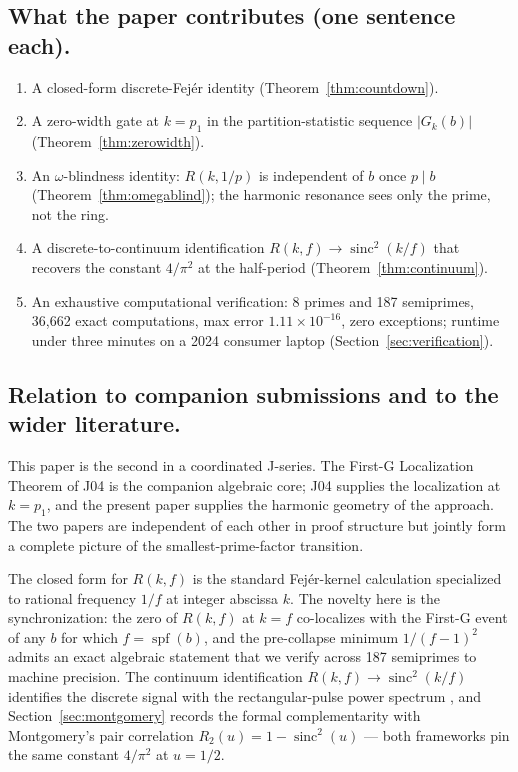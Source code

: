 \documentclass[11pt,reqno]{amsart}
\theoremstyle{plain}
\theoremstyle{definition}
\theoremstyle{remark}
\DeclareMathOperator{\spf}{spf}
\DeclareMathOperator{\sinc}{sinc}
\begin{document}
\subsection*{What the paper contributes (one sentence each).}
\begin{enumerate}[label={\upshape(\arabic*)}]
\item A closed-form discrete-Fej\'er identity (Theorem~\ref{thm:countdown}).
\item A zero-width gate at $k = p_1$ in the partition-statistic
      sequence $|G_k(b)|$ (Theorem~\ref{thm:zerowidth}).
\item An $\omega$-blindness identity: $R(k, 1/p)$ is independent of
      $b$ once $p \mid b$ (Theorem~\ref{thm:omegablind}); the
      harmonic resonance sees only the prime, not the ring.
\item A discrete-to-continuum identification $R(k, f) \to \sinc^2(k/f)$
      that recovers the constant $4/\pi^2$ at the half-period
      (Theorem~\ref{thm:continuum}).
\item An exhaustive computational verification: 8 primes and 187
      semiprimes, 36{,}662 exact computations, max error
      $1.11 \times 10^{-16}$, zero exceptions; runtime under three
      minutes on a 2024 consumer laptop (Section~\ref{sec:verification}).
\end{enumerate}

\subsection*{Relation to companion submissions and to the wider
literature.}
This paper is the second in a coordinated J-series. The First-G
Localization Theorem of J04 \cite{J04Sanders} is the companion
algebraic core; J04 supplies the localization at $k = p_1$, and
the present paper supplies the harmonic geometry of the approach.
The two papers are independent of each other in proof structure
but jointly form a complete picture of the smallest-prime-factor
transition.

The closed form for $R(k, f)$ is the standard Fej\'er-kernel
calculation \cite{Fejer1900,Apostol1976,OppenheimSchafer2010}
specialized to rational frequency $1/f$ at integer abscissa $k$.
The novelty here is the synchronization: the zero of $R(k, f)$ at
$k = f$ co-localizes with the First-G event of any $b$ for which
$f = \spf(b)$, and the pre-collapse minimum $1/(f - 1)^2$ admits
an exact algebraic statement that we verify across 187 semiprimes
to machine precision. The continuum identification
$R(k, f) \to \sinc^2(k/f)$ identifies the discrete signal with
the rectangular-pulse power spectrum \cite{Shannon1949,
OppenheimSchafer2010,Bochner1933}, and Section~\ref{sec:montgomery}
records the formal complementarity with Montgomery's pair
correlation $R_2(u) = 1 - \sinc^2(u)$ \cite{Montgomery1973} ---
both frameworks pin the same constant $4/\pi^2$ at $u = 1/2$.
\end{document}
